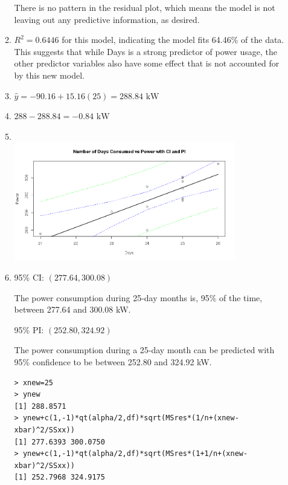\documentclass[12pt,letterpaper]{article}
\begin{document}
\begin{enumerate}
\begin{enumerate}
        There is no pattern in the residual plot, which means the model is not
        leaving out any predictive information, as desired.
      \item $R^2 = 0.6446$ for this model, indicating the model fits 64.46\% of
        the data. This suggests that while Days is a strong predictor of power
        usage, the other predictor variables also have some effect that is not
        accounted for by this new model.
      \item $\hat{y} = -90.16 + 15.16(25) = \boxed{288.84\text{ kW}}$
      \item $288-288.84 = \boxed{-0.84\text{ kW}}$
      \item \hfill\\
        \includegraphics[width=0.8\textwidth]{3h.png}
      \item 95\% CI: $(277.64, 300.08)$

        The power consumption during 25-day months is, 95\% of the time,
        between 277.64 and 300.08 kW.

        95\% PI: $(252.80, 324.92)$

        The power consumption during a 25-day month can be predicted with 95\%
        confidence to be between 252.80 and 324.92 kW.

        \begin{verbatim}
> xnew=25
> ynew
[1] 288.8571
> ynew+c(1,-1)*qt(alpha/2,df)*sqrt(MSres*(1/n+(xnew-xbar)^2/SSxx))
[1] 277.6393 300.0750
> ynew+c(1,-1)*qt(alpha/2,df)*sqrt(MSres*(1+1/n+(xnew-xbar)^2/SSxx))
[1] 252.7968 324.9175
        \end{verbatim}


    \end{enumerate}
\end{enumerate}
\end{document}
